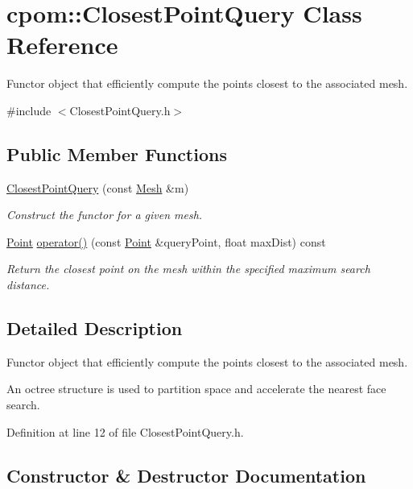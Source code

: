 \hypertarget{classcpom_1_1_closest_point_query}{}\section{cpom\+:\+:Closest\+Point\+Query Class Reference}
\label{classcpom_1_1_closest_point_query}


Functor object that efficiently compute the points closest to the associated mesh.  




{\ttfamily \#include $<$Closest\+Point\+Query.\+h$>$}

\subsection*{Public Member Functions}
\begin{DoxyCompactItemize}
\item 
\hyperlink{classcpom_1_1_closest_point_query_ae001e975e845aea88228e33baec51ad9}{Closest\+Point\+Query} (const \hyperlink{classcpom_1_1_mesh}{Mesh} \&m)
\begin{DoxyCompactList}\small\item\em Construct the functor for a given mesh. \end{DoxyCompactList}\item 
\hyperlink{structcpom_1_1_float3}{Point} \hyperlink{classcpom_1_1_closest_point_query_a3e5c47f7c9161f3a8448800bb7ad5e2c}{operator()} (const \hyperlink{structcpom_1_1_float3}{Point} \&query\+Point, float max\+Dist) const 
\begin{DoxyCompactList}\small\item\em Return the closest point on the mesh within the specified maximum search distance. \end{DoxyCompactList}\end{DoxyCompactItemize}


\subsection{Detailed Description}
Functor object that efficiently compute the points closest to the associated mesh. 

An octree structure is used to partition space and accelerate the nearest face search. 

Definition at line 12 of file Closest\+Point\+Query.\+h.



\subsection{Constructor \& Destructor Documentation}
